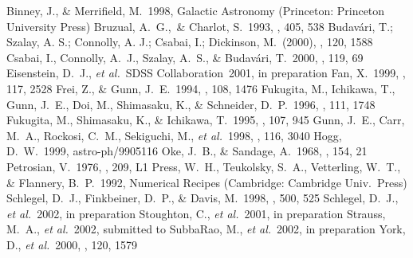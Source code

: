 Binney, J., \& Merrifield, M.~1998, Galactic Astronomy (Princeton:
Princeton University Press)
Bruzual, A.~G.,~\& Charlot, S.~1993, \apj, {405}, 538
Budav\'ari, T.; Szalay, A. S.; Connolly, A. J.; Csabai, I.; Dickinson,
M.~(2000), \aj, 120, 1588
Csabai, I., Connolly, A.~J., Szalay, A.~S., \& Budav\'ari,
T.~2000, \aj, 119, 69
Eisenstein, D.~J., {\it et al.}~SDSS Collaboration~2001, in preparation
Fan, X.~1999, \aj, 117, 2528
Frei, Z., \& Gunn, J.~E.~1994, \aj, 108, 1476
Fukugita, M., Ichikawa, T., Gunn, J.~E., Doi, M., Shimasaku, K., \&
Schneider, D.~P.~1996, \aj, 111, 1748
Fukugita, M., Shimasaku, K., \& Ichikawa, T.~1995, \pasp, 107, 945
Gunn, J.~E., Carr, M.~A., Rockosi, C.~M., Sekiguchi, M., {\it et al.}~1998, \aj, 116, 3040
Hogg, D.~W.~1999, astro-ph/9905116 
Oke, J.~B., \& Sandage, A.~1968, \apj, 154, 21
Petrosian, V.~1976, \apj, 209, L1
Press, W.~H., Teukolsky, S.~A., Vetterling, W.~T., \& Flannery,
B.~P.~1992, Numerical Recipes (Cambridge: Cambridge Univ.~Press)
Schlegel, D.~J., Finkbeiner, D.~P., \& Davis, M.~1998, \apj, 500, 525
Schlegel, D.~J., {\it et al.}~2002, in preparation
Stoughton, C., {\it et al.}~2001, in preparation
Strauss, M.~A., {\it et al.}~2002, submitted to \aj
{}
SubbaRao, M., {\it et al.}~2002, in preparation
York, D., {\it et al.}~2000, \aj, 120, 1579
